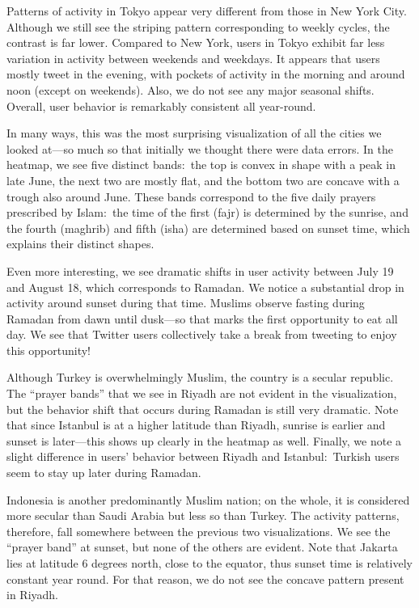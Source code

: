 \documentclass[letterpaper]{article}
\begin{document}

\smallskip {} Patterns of activity in Tokyo appear
very different from those in New York City. Although we still see the
striping pattern corresponding to weekly cycles, the contrast is far
lower. Compared to New York, users in Tokyo exhibit far less variation
in activity between weekends and weekdays. It appears that users
mostly tweet in the evening, with pockets of activity in the morning
and around noon (except on weekends). Also, we do not see any major
seasonal shifts. Overall, user behavior is remarkably consistent all
year-round.

\smallskip {} In many ways, this was the most
surprising visualization of all the cities we looked at---so much so that initially
we thought there were data errors.
In the heatmap, we see five distinct bands:\ the top is convex in shape
with a peak in late June, the next two are mostly flat, and the bottom
two are concave with a trough also around June. These bands correspond
to the five daily prayers prescribed by Islam:\ the time of the first
(fajr) is determined by the sunrise, and the fourth (maghrib) and
fifth (isha) are determined based on sunset time, which explains
their distinct shapes.

Even more interesting, we see dramatic shifts in user activity between
July 19 and August 18, which corresponds to Ramadan. We notice a
substantial drop in activity around sunset during that time. Muslims
observe fasting during Ramadan from dawn until dusk---so that marks the first
opportunity to eat all day. We see that Twitter users collectively
take a break from tweeting to enjoy this opportunity!

\smallskip {} Although Turkey is overwhelmingly
Muslim, the country is a secular republic. The ``prayer
bands'' that we see in Riyadh are not evident in the visualization,
but the behavior shift that occurs during Ramadan is still very
dramatic. Note that since Istanbul is at a higher latitude than
Riyadh, sunrise is earlier and sunset is later---this shows up clearly
in the heatmap as well. Finally, we note a slight difference in users'
behavior between Riyadh and Istanbul:\ Turkish users seem to stay up
later during Ramadan.

\smallskip {} Indonesia is another
predominantly Muslim nation; on the whole, it is considered more
secular than Saudi Arabia but less so than Turkey. The activity
patterns, therefore, fall somewhere between the previous two
visualizations. We see the ``prayer band'' at sunset, but none of the
others are evident. Note that Jakarta lies at latitude 6 degrees north, close
to the equator, thus sunset time is relatively constant year
round. For that reason, we do not see the concave pattern present in
Riyadh.
\end{document}
